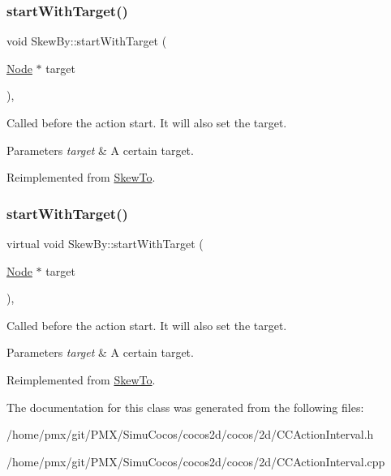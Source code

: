 \subsubsection{\texorpdfstring{start\+With\+Target()}{startWithTarget()}\hspace{0.1cm}{\footnotesize\ttfamily [1/2]}}
{\footnotesize\ttfamily void Skew\+By\+::start\+With\+Target (\begin{DoxyParamCaption}\item[{\hyperlink{classNode}{Node} $\ast$}]{target }\end{DoxyParamCaption})\hspace{0.3cm}{\ttfamily [override]}, {\ttfamily [virtual]}}

Called before the action start. It will also set the target.


\begin{DoxyParams}{Parameters}
{\em target} & A certain target. \\
\hline
\end{DoxyParams}


Reimplemented from \hyperlink{classSkewTo_a43613e8ef08aead6e3dab8d27dda7c0e}{Skew\+To}.

\mbox{\label{classSkewBy_aaf859fd8f95807064391ebeb6cd9243f}} 
\subsubsection{\texorpdfstring{start\+With\+Target()}{startWithTarget()}\hspace{0.1cm}{\footnotesize\ttfamily [2/2]}}
{\footnotesize\ttfamily virtual void Skew\+By\+::start\+With\+Target (\begin{DoxyParamCaption}\item[{\hyperlink{classNode}{Node} $\ast$}]{target }\end{DoxyParamCaption})\hspace{0.3cm}{\ttfamily [override]}, {\ttfamily [virtual]}}

Called before the action start. It will also set the target.


\begin{DoxyParams}{Parameters}
{\em target} & A certain target. \\
\hline
\end{DoxyParams}


Reimplemented from \hyperlink{classSkewTo_a43613e8ef08aead6e3dab8d27dda7c0e}{Skew\+To}.



The documentation for this class was generated from the following files\+:\begin{DoxyCompactItemize}
\item 
/home/pmx/git/\+P\+M\+X/\+Simu\+Cocos/cocos2d/cocos/2d/C\+C\+Action\+Interval.\+h\item 
/home/pmx/git/\+P\+M\+X/\+Simu\+Cocos/cocos2d/cocos/2d/C\+C\+Action\+Interval.\+cpp\end{DoxyCompactItemize}
